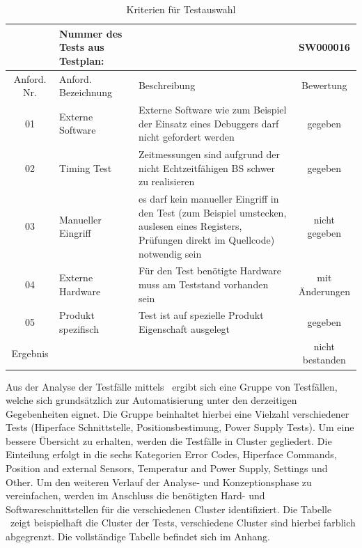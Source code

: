 \begin{table}[h]
\begin{center}
\begin{tabularx}{\textwidth}{|c|X|X|c|}
\hline
\rowcolor{cyan} & Nummer des Tests aus Testplan: & & SW000016  \\
\hline
\rowcolor[gray]{0.6} Anford. Nr. & Anford. Bezeichnung & Beschreibung & Bewertung \\
\hline
01 & Externe Software & Externe Software wie zum Beispiel der Einsatz eines Debuggers darf nicht gefordert werden & \cellcolor{green}gegeben \\
\hline
02 & Timing Test & Zeitmessungen sind aufgrund der nicht Echtzeitfähigen BS schwer zu realisieren & \cellcolor{green} gegeben \\
\hline
03 & Manueller Eingriff & es darf kein manueller Eingriff in den Test (zum Beispiel umstecken, auslesen eines Registers, Prüfungen direkt im Quellcode) notwendig sein
 & \cellcolor{red} nicht gegeben \\
\hline
04 & Externe Hardware & Für den Test benötigte Hardware muss am Teststand vorhanden sein &\cellcolor{yellow} mit Änderungen \\
\hline
05 & Produkt spezifisch & Test ist auf spezielle Produkt Eigenschaft ausgelegt & \cellcolor{green}gegeben \\
\hline
\rowcolor[gray]{0.6} Ergebnis & & &\cellcolor{red} nicht bestanden \\
\hline
\end{tabularx}
\end{center}
\caption{Kriterien für Testauswahl \label{tab:KriterienAuto}}
\end{table}
\cleardoublepage

Aus der Analyse der Testfälle mittels \dq {}\dq~ergibt sich eine Gruppe von Testfällen, welche sich grundsätzlich zur Automatisierung unter den derzeitigen Gegebenheiten eignet. Die Gruppe beinhaltet hierbei eine Vielzahl verschiedener Tests (Hiperface Schnittstelle, Positionsbestimung, Power Supply Tests). Um eine bessere Übersicht zu erhalten, werden die Testfälle in Cluster gegliedert. Die Einteilung erfolgt in die sechs Kategorien Error Codes, Hiperface Commands, Position and external Sensors, Temperatur and Power Supply, Settings und Other. Um den weiteren Verlauf der Analyse- und Konzeptionsphase zu vereinfachen, werden im Anschluss die benötigten Hard- und Softwareschnittstellen für die verschiedenen Cluster identifiziert. Die Tabelle \dq {}\dq~zeigt beispielhaft die Cluster der  Tests, verschiedene Cluster sind hierbei farblich abgegrenzt. Die vollständige Tabelle befindet sich im Anhang.

